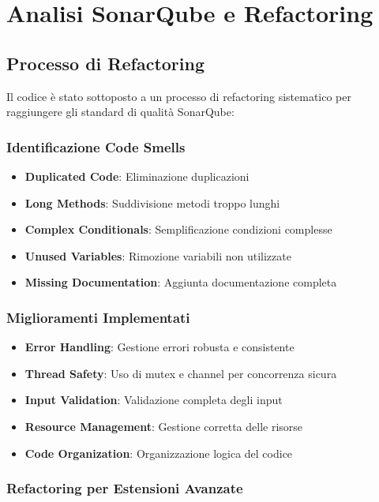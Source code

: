\documentclass[12pt,a4paper]{article}
\begin{document}
\section{Analisi SonarQube e Refactoring}

\subsection{Processo di Refactoring}

Il codice è stato sottoposto a un processo di refactoring sistematico per raggiungere gli standard di qualità SonarQube:

\subsubsection{Identificazione Code Smells}

\begin{itemize}
\item \textbf{Duplicated Code}: Eliminazione duplicazioni
\item \textbf{Long Methods}: Suddivisione metodi troppo lunghi
\item \textbf{Complex Conditionals}: Semplificazione condizioni complesse
\item \textbf{Unused Variables}: Rimozione variabili non utilizzate
\item \textbf{Missing Documentation}: Aggiunta documentazione completa
\end{itemize}

\subsubsection{Miglioramenti Implementati}

\begin{itemize}
\item \textbf{Error Handling}: Gestione errori robusta e consistente
\item \textbf{Thread Safety}: Uso di mutex e channel per concorrenza sicura
\item \textbf{Input Validation}: Validazione completa degli input
\item \textbf{Resource Management}: Gestione corretta delle risorse
\item \textbf{Code Organization}: Organizzazione logica del codice
\end{itemize}

\subsubsection{Refactoring per Estensioni Avanzate}
\end{document}
